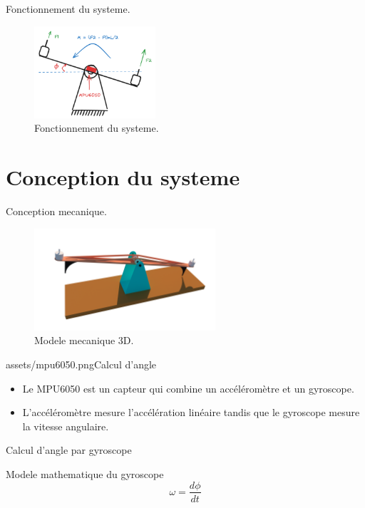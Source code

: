 \documentclass{beamer}
\begin{document}
\begin{frame}{Fonctionnement du systeme.}
	\begin{figure}
		\centering
		\includegraphics[width=0.4\textwidth]{assets/fonction.png}
		\caption{Fonctionnement du systeme.}
	\end{figure}
\end{frame}

\section{Conception du systeme}

\begin{frame}{Conception mecanique.}
\begin{figure}
	\centering
	\includegraphics[width=0.6\textwidth]{assets/3d-cad.png}
	\caption{Modele mecanique 3D.}
\end{figure}
\end{frame}


\begin{sidepic}{assets/mpu6050.png}{Calcul d'angle}
	\begin{itemize}
		\item Le MPU6050 est un capteur qui combine un accéléromètre et un gyroscope.
		\item L'accéléromètre mesure l'accélération linéaire tandis que le gyroscope mesure la vitesse angulaire.
	\end{itemize}
\end{sidepic}

\begin{frame}[fragile]{Calcul d'angle par gyroscope}
	\begin{block}{Modele mathematique du gyroscope}
		\begin{equation*}
			\omega = \frac{d\phi}{dt}
		\end{equation*}
	\end{block}
\end{frame}
\end{document}
